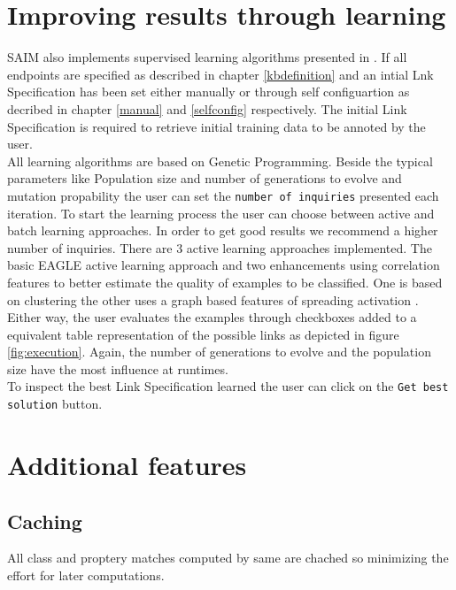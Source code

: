 \documentclass[oneside,a4paper,12pt]{memoir}
\begin{document}
\chapter{Improving results through learning}
\label{learning}
SAIM also implements supervised learning algorithms presented in \cite{NGLY12}. If all endpoints are specified as described in chapter \ref{kbdefinition} and an intial Lnk Specification has been set either manually or through self configuartion as decribed in chapter \ref{manual} and \ref{selfconfig} respectively. The initial Link Specification is required to retrieve initial training data to be annoted by the user.\\
All learning algorithms are based on Genetic Programming. Beside the typical parameters like Population size and number of generations to evolve and mutation propability the user can set the \texttt{number of inquiries} presented each iteration. To start the learning process the user can choose between active and batch learning approaches. In order to get good results we recommend a higher number of inquiries. There are 3 active learning approaches implemented. The basic EAGLE active learning approach \cite{NGLY12} and two enhancements using correlation features to better estimate the quality of examples to be classified. One is based on clustering the other uses a graph based features of spreading activation \cite{NGO+13}.\\
Either way, the user evaluates the examples through checkboxes added to a equivalent table representation of the possible links as depicted in figure \ref{fig:execution}. Again, the number of generations to evolve and the population size have the most influence at runtimes.\\
To inspect the best Link Specification learned the user can click on the \texttt{Get best solution} button.

\chapter{Additional features}
\label{features}

\section{Caching}
\label{caching}
All class and proptery matches computed by same are chached so minimizing the effort for later computations.
\end{document}
